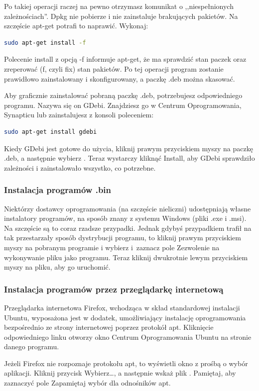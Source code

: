 Po takiej operacji raczej na pewno otrzymasz komunikat o ,,niespełnionych zależnościach''. Dpkg nie pobierze i nie zainstaluje brakujących pakietów. Na szczęście apt-get potrafi to naprawić. Wykonaj:
\begin{lstlisting}[language=bash]
sudo apt-get install -f
\end{lstlisting}

Polecenie \textcolor{ubuntu_orange}{install} z opcją \textcolor{ubuntu_orange}{-f} informuje apt-get, że ma sprawdzić stan paczek oraz zreperować (f, czyli fix) stan pakietów. Po tej operacji program zostanie prawidłowo zainstalowany i skonfigurowany, a paczkę .deb można skasować.

Aby graficznie zainstalować pobraną paczkę .deb, potrzebujesz odpowiedniego programu. Nazywa się on \textcolor{ubuntu_orange}{GDebi}. Znajdziesz go w Centrum Oprogramowania, Synapticu lub zainstalujesz z konsoli poleceniem:
\begin{lstlisting}[language=bash]
sudo apt-get install gdebi
\end{lstlisting}

Kiedy GDebi jest gotowe do użycia, kliknij prawym przyciskiem myszy na paczkę .deb, a następnie wybierz . Teraz wystarczy kliknąć \textcolor{ubuntu_orange}{Install}, aby GDebi sprawdziło zależności i zainstalowało wszystko, co potrzebne.

\subsubsection{Instalacja programów .bin}
Niektórzy dostawcy oprogramowania (na szczęście nieliczni) udostępniają własne instalatory programów, na sposób znany z systemu Windows (pliki .exe i .msi). Na szczęście są to coraz rzadsze przypadki. Jednak gdybyś przypadkiem trafił na tak przestarzały sposób dystrybucji programu, to kliknij prawym przyciskiem myszy na pobranym programie i wybierz  i~zaznacz pole \textcolor{ubuntu_orange}{Zezwolenie na wykonywanie pliku jako programu}. Teraz kliknij dwukrotnie lewym przyciskiem myszy na pliku, aby go uruchomić.

\subsubsection{Instalacja programów przez przeglądarkę internetową}
Przeglądarka internetowa Firefox, wchodząca w skład standardowej instalacji Ubuntu, wyposażona jest w dodatek, umożliwiający instalację oprogramowania bezpośrednio ze strony internetowej poprzez protokół apt. Kliknięcie odpowiedniego linku otworzy okno \textcolor{ubuntu_orange}{Centrum Oprogramowania Ubuntu} na stronie danego programu.

Jeżeli Firefox nie rozpoznaje protokołu apt, to wyświetli okno z prośbą o wybór aplikacji. Kliknij przycisk \textcolor{ubuntu_orange}{Wybierz\ldots}, a następnie wskaż plik . Pamiętaj, aby zaznaczyć pole \textcolor{ubuntu_orange}{Zapamiętaj wybór dla odnośników apt}.
\clearpage